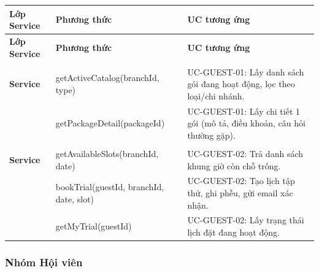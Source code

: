 \begingroup
\renewcommand{\arraystretch}{1.3}
\begin{longtable}{|>{\centering\arraybackslash}m{2.8cm}|>{\sloppy\small\ttfamily\raggedright\arraybackslash}p{7cm}|>{\raggedright\arraybackslash}m{4.5cm}|}
\hline
\textbf{Lớp Service} & \normalfont\normalsize\textbf{Phương thức} & \textbf{UC tương ứng} \\ \hline
\endfirsthead
\hline
\textbf{Lớp Service} & \normalfont\normalsize\textbf{Phương thức} & \textbf{UC tương ứng} \\ \hline
\endhead
\hline
\endfoot

\multirow{2}{*}{\makecell{\textbf{Package}\\\textbf{Service}}} &
  getActiveCatalog(branchId, type) &
  UC-GUEST-01: Lấy danh sách gói đang hoạt động, lọc theo loại/chi nhánh. \\ \cline{2-3}
& getPackageDetail(packageId) &
  UC-GUEST-01: Lấy chi tiết 1 gói (mô tả, điều khoản, câu hỏi thường gặp). \\ \hline

\multirow{3}{*}{\makecell{\textbf{Trial}\\\textbf{Service}}} &
  getAvailableSlots(branchId, date) &
  UC-GUEST-02: Trả danh sách khung giờ còn chỗ trống. \\ \cline{2-3}
& bookTrial(guestId, branchId, date, slot) &
  UC-GUEST-02: Tạo lịch tập thử, ghi phễu, gửi email xác nhận. \\ \cline{2-3}
& getMyTrial(guestId) &
  UC-GUEST-02: Lấy trạng thái lịch đặt đang hoạt động. \\ \hline

\end{longtable}
\endgroup

\subsubsection*{Nhóm Hội viên}

